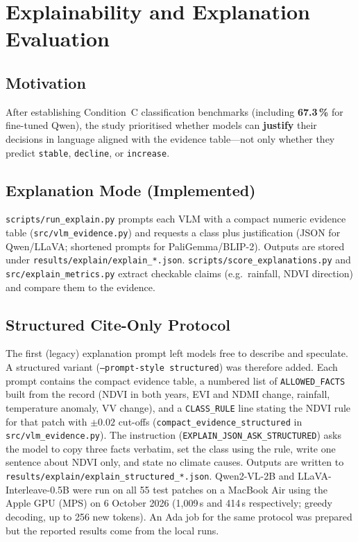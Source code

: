 \documentclass[11pt]{article}
\begin{document}
\section{Explainability and Explanation Evaluation}

\subsection{Motivation}
After establishing Condition~C classification benchmarks (including \textbf{67.3\,\%} for fine-tuned Qwen), the study prioritised whether models can \textbf{justify} their decisions in language aligned with the evidence table---not only whether they predict \texttt{stable}, \texttt{decline}, or \texttt{increase}.

\subsection{Explanation Mode (Implemented)}
\texttt{scripts/run\_explain.py} prompts each VLM with a compact numeric evidence table (\texttt{src/vlm\_evidence.py}) and requests a class plus justification (JSON for Qwen/LLaVA; shortened prompts for PaliGemma/BLIP-2). Outputs are stored under \texttt{results/explain/explain\_*.json}. \texttt{scripts/score\_explanations.py} and \texttt{src/explain\_metrics.py} extract checkable claims (e.g.\ rainfall, NDVI direction) and compare them to the evidence.

\subsection{Structured Cite-Only Protocol}
The first (legacy) explanation prompt left models free to describe and speculate. A structured variant (\texttt{--prompt-style structured}) was therefore added. Each prompt contains the compact evidence table, a numbered list of \texttt{ALLOWED\_FACTS} built from the record (NDVI in both years, EVI and NDMI change, rainfall, temperature anomaly, VV change), and a \texttt{CLASS\_RULE} line stating the NDVI rule for that patch with $\pm0.02$ cut-offs (\texttt{compact\_evidence\_structured} in \texttt{src/vlm\_evidence.py}). The instruction (\texttt{EXPLAIN\_JSON\_ASK\_STRUCTURED}) asks the model to copy three facts verbatim, set the class using the rule, write one sentence about NDVI only, and state no climate causes. Outputs are written to \texttt{results/explain/explain\_structured\_*.json}. Qwen2-VL-2B and LLaVA-Interleave-0.5B were run on all 55 test patches on a MacBook Air using the Apple GPU (MPS) on 6 October 2026 (1,009\,s and 414\,s respectively; greedy decoding, up to 256 new tokens). An Ada job for the same protocol was prepared but the reported results come from the local runs.
\end{document}
